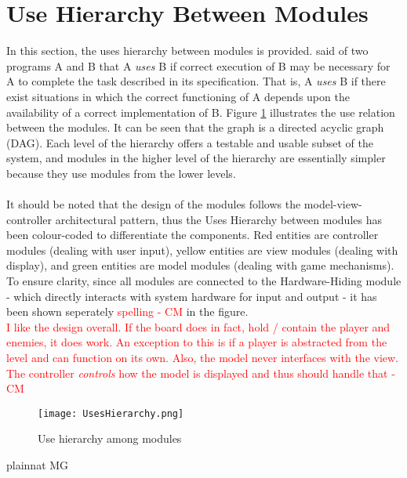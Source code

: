 \documentclass[12pt, titlepage]{article}
\begin{document}
\section{Use Hierarchy Between Modules} \label{SecUse}

In this section, the uses hierarchy between modules is
provided. \citet{Parnas1978} said of two programs A and B that A {\em uses} B if
correct execution of B may be necessary for A to complete the task described in
its specification. That is, A {\em uses} B if there exist situations in which
the correct functioning of A depends upon the availability of a correct
implementation of B.  Figure \ref{FigUH} illustrates the use relation between
the modules. It can be seen that the graph is a directed acyclic graph
(DAG). Each level of the hierarchy offers a testable and usable subset of the
system, and modules in the higher level of the hierarchy are essentially simpler
because they use modules from the lower levels.\\\\
\noindent It should be noted that the design of the modules follows the model-view-controller
architectural pattern, thus the Uses Hierarchy between modules has been colour-coded to differentiate
the components. Red entities are controller modules (dealing with user input), yellow entities are view 
modules (dealing with display), and green entities are model modules (dealing with game mechanisms).
To ensure clarity, since all modules are connected to the Hardware-Hiding module - which directly interacts
with system hardware for input and output - it has been shown seperately \textcolor{red}{spelling - CM} in the figure. \\
\textcolor{red}{I like the design overall. If the board does in fact, hold / contain the player and enemies, it does work. An exception to this is if a player is abstracted from the level and can function on its own. Also, the model never interfaces with the view. The controller \textit{controls} how the model is displayed and thus should handle that - CM} \\
\begin{figure}[H]
\centering
\texttt{[image: UsesHierarchy.png]}
\caption{Use hierarchy among modules}
\label{FigUH}
\end{figure}

\newpage
 {plainnat}
 {MG}
\end{document}
